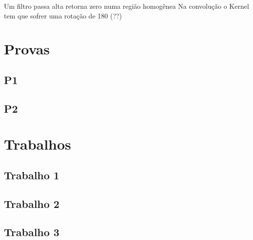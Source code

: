 \documentclass[twocolumn, 10pt]{article}
\begin{document}
Um filtro passa alta retorna zero numa região homogênea
Na convolução o Kernel tem que sofrer uma rotação de 180 (??)


\section*{Provas}
\label{sec:org5898047}
\subsection*{P1}
\label{sec:org14e1dea}
\subsection*{P2}
\label{sec:orgb030bb4}
\section*{Trabalhos}
\label{sec:org78e3003}
\subsection*{Trabalho 1}
\label{sec:orgca62dd2}
\subsection*{Trabalho 2}
\label{sec:orgc89dcf8}
\subsection*{Trabalho 3}
\label{sec:org442fddd}
\end{document}
